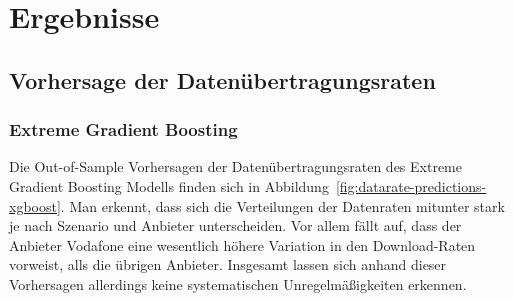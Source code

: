 \section{Ergebnisse}

\subsection{Vorhersage der Daten\"ubertragungsraten}

\subsubsection{Extreme Gradient Boosting}

Die Out-of-Sample Vorhersagen der Da\-ten\"uber\-tra\-gungs\-ra\-ten des Extreme Gradient Boosting Modells
finden sich in Abbildung~\ref{fig:datarate-predictions-xgboost}.
Man erkennt, dass sich die Verteilungen der Datenraten mitunter stark je nach Szenario und Anbieter unterscheiden.
Vor allem f\"allt auf, dass der Anbieter Vodafone eine wesentlich h\"ohere Variation in den Download-Raten vorweist,
alls die \"ubrigen Anbieter.
Insgesamt lassen sich anhand dieser Vorhersagen allerdings keine systematischen Unregelm\"a{\ss}igkeiten erkennen.
